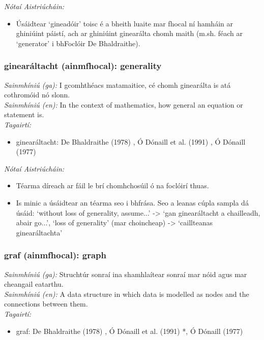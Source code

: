  \noindent \textit{Nótaí Aistriúcháin:}
\begin{itemize}
	\item Úsáidtear `gineadóir' toisc é a bheith luaite mar fhocal ní hamháin ar ghiniúint páistí, ach ar ghiniúint ginearálta chomh maith (m.sh. féach ar `generator' i bhFoclóir De Bhaldraithe).
\end{itemize}


\subsubsection*{ginearáltacht (ainmfhocal): generality}
 \noindent \textit{Sainmhíniú (ga):} I gcomhthéacs matamaitice, cé chomh ginearálta is atá cothromóid nó slonn.
\\
 \noindent \textit{Sainmhíniú (en):} In the context of mathematics, how general an equation or statement is.
\\
 \noindent \textit{Tagairtí:}
\begin{itemize}
	\item ginearáltacht: De Bhaldraithe (1978) \cite{de-bhaldraithe}, Ó Dónaill et al. (1991) \cite{focloir-beag}, Ó Dónaill (1977) \cite{odonaill}
\end{itemize}

 \noindent \textit{Nótaí Aistriúcháin:}
\begin{itemize}
	\item Téarma díreach ar fáil le brí chomhchosúil ó na foclóirí thuas.
	\item Is minic a úsáidtear an téarma seo i bhfrása. Seo a leanas cúpla sampla dá úsáid: `without loss of generality, assume...' -> `gan ginearáltacht a chailleadh, abair go...', `loss of generality' (mar choincheap) -> `caillteanas ginearáltachta'
\end{itemize}


\subsubsection*{graf (ainmfhocal): graph}
 \noindent \textit{Sainmhíniú (ga):} Struchtúr sonraí ina shamhlaítear sonraí mar nóid agus mar cheangail eatarthu.
\\
 \noindent \textit{Sainmhíniú (en):} A data structure in which data is modelled as nodes and the connections between them.
\\
 \noindent \textit{Tagairtí:}
\begin{itemize}
	\item graf: De Bhaldraithe (1978) \cite{de-bhaldraithe}, Ó Dónaill et al. (1991) \cite{focloir-beag}*, Ó Dónaill (1977) \cite{odonaill}
\end{itemize}

